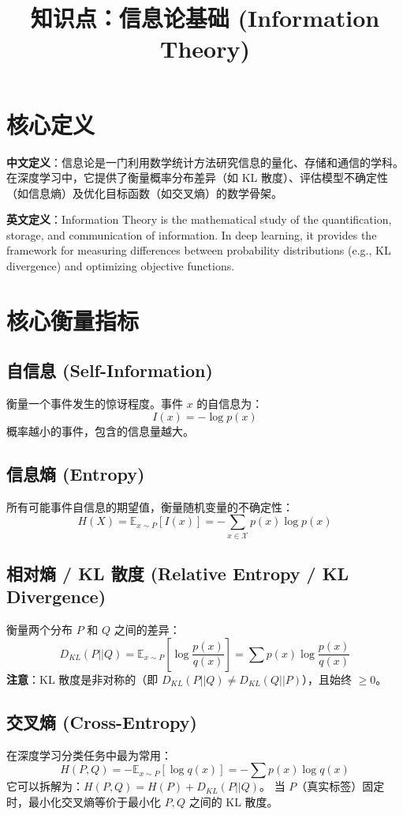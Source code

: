 \documentclass[12pt, a4paper]{article}
\title{知识点：信息论基础 (Information Theory)}
\author{}
\date{}
\begin{document}
\maketitle

\section{核心定义}
\textbf{中文定义}：信息论是一门利用数学统计方法研究信息的量化、存储和通信的学科。在深度学习中，它提供了衡量概率分布差异（如 KL 散度）、评估模型不确定性（如信息熵）及优化目标函数（如交叉熵）的数学骨架。

\textbf{英文定义}：Information Theory is the mathematical study of the quantification, storage, and communication of information. In deep learning, it provides the framework for measuring differences between probability distributions (e.g., KL divergence) and optimizing objective functions.

\section{核心衡量指标}

\subsection{自信息 (Self-Information)}
衡量一个事件发生的惊讶程度。事件 $x$ 的自信息为：
$$ I(x) = -\log p(x) $$
概率越小的事件，包含的信息量越大。

\subsection{信息熵 (Entropy)}
所有可能事件自信息的期望值，衡量随机变量的不确定性：
$$ H(X) = \mathbb{E}_{x \sim P} [I(x)] = -\sum_{x \in \mathcal{X}} p(x) \log p(x) $$

\subsection{相对熵 / KL 散度 (Relative Entropy / KL Divergence)}
衡量两个分布 $P$ 和 $Q$ 之间的差异：
$$ D_{KL}(P || Q) = \mathbb{E}_{x \sim P} \left[ \log \frac{p(x)}{q(x)} \right] = \sum p(x) \log \frac{p(x)}{q(x)} $$
\textbf{注意}：KL 散度是非对称的（即 $D_{KL}(P||Q) \neq D_{KL}(Q||P)$），且始终 $\geq 0$。

\subsection{交叉熵 (Cross-Entropy)}
在深度学习分类任务中最为常用：
$$ H(P, Q) = -\mathbb{E}_{x \sim P} [\log q(x)] = -\sum p(x) \log q(x) $$
它可以拆解为：$H(P, Q) = H(P) + D_{KL}(P || Q)$。
当 $P$（真实标签）固定时，最小化交叉熵等价于最小化 $P, Q$ 之间的 KL 散度。
\end{document}
